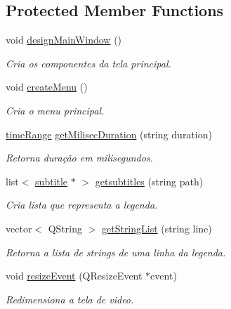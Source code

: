 \subsection*{Protected Member Functions}
\begin{DoxyCompactItemize}
\item 
void \hyperlink{classMainWindow_abc2fe19d0ae9507b0b3f5dfa7e6e0fea}{design\+Main\+Window} ()
\begin{DoxyCompactList}\small\item\em Cria os componentes da tela principal. \end{DoxyCompactList}\item 
void \hyperlink{classMainWindow_a03799692902ab88a551b4dca1fa042db}{create\+Menu} ()
\begin{DoxyCompactList}\small\item\em Cria o menu principal. \end{DoxyCompactList}\item 
\hyperlink{structtimeRange}{time\+Range} \hyperlink{classMainWindow_a79cc6f131a72ba24e71ca6143e175726}{get\+Milisec\+Duration} (string duration)
\begin{DoxyCompactList}\small\item\em Retorna duração em milisegundos. \end{DoxyCompactList}\item 
list$<$ \hyperlink{structsubtitle}{subtitle} $\ast$ $>$ \hyperlink{classMainWindow_adf409fa41443eebae1afbe6b26746179}{getsubtitles} (string path)
\begin{DoxyCompactList}\small\item\em Cria lista que representa a legenda. \end{DoxyCompactList}\item 
vector$<$ Q\+String $>$ \hyperlink{classMainWindow_a0379a5ad1b2b9faaf543bae96d1bf479}{get\+String\+List} (string line)
\begin{DoxyCompactList}\small\item\em Retorna a lista de strings de uma linha da legenda. \end{DoxyCompactList}\item 
void \hyperlink{classMainWindow_ae12f8f63791595567b6250f8bb002bda}{resize\+Event} (Q\+Resize\+Event $\ast$event)
\begin{DoxyCompactList}\small\item\em Redimensiona a tela de video. \end{DoxyCompactList}\end{DoxyCompactItemize}
